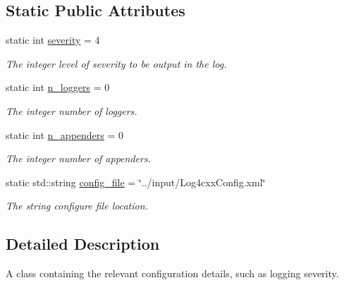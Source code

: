 \subsection*{Static Public Attributes}
\begin{DoxyCompactItemize}
\item 
\hypertarget{classconfig_a7f2baa7c18c044ff959ca9bf28b5dbce}{static int \hyperlink{classconfig_a7f2baa7c18c044ff959ca9bf28b5dbce}{severity} = 4}\label{classconfig_a7f2baa7c18c044ff959ca9bf28b5dbce}

\begin{DoxyCompactList}\small\item\em The integer level of severity to be output in the log. \end{DoxyCompactList}\item 
\hypertarget{classconfig_a8d6df12647fe0703684ef37a28b5ccc4}{static int \hyperlink{classconfig_a8d6df12647fe0703684ef37a28b5ccc4}{n\-\_\-loggers} = 0}\label{classconfig_a8d6df12647fe0703684ef37a28b5ccc4}

\begin{DoxyCompactList}\small\item\em The integer number of loggers. \end{DoxyCompactList}\item 
\hypertarget{classconfig_a4efeb77cc039656c07307d782d15c0d3}{static int \hyperlink{classconfig_a4efeb77cc039656c07307d782d15c0d3}{n\-\_\-appenders} = 0}\label{classconfig_a4efeb77cc039656c07307d782d15c0d3}

\begin{DoxyCompactList}\small\item\em The integer number of appenders. \end{DoxyCompactList}\item 
\hypertarget{classconfig_a10991c86d007e8915d8b54033fc9022a}{static std\-::string \hyperlink{classconfig_a10991c86d007e8915d8b54033fc9022a}{config\-\_\-file} = \char`\"{}../input/Log4cxx\-Config.\-xml\char`\"{}}\label{classconfig_a10991c86d007e8915d8b54033fc9022a}

\begin{DoxyCompactList}\small\item\em The string configure file location. \end{DoxyCompactList}\end{DoxyCompactItemize}


\subsection{Detailed Description}
A class containing the relevant configuration details, such as logging severity. 



